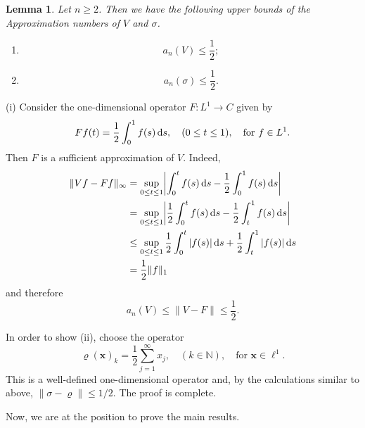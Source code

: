 \documentclass[10pt,reqno]{amsart}
\def\N{\mathbb{N}}
\def\d{{\fam0 d}}
\newtheorem{lemma}[theorem]{Lemma}
\numberwithin{equation}{section}
\let\oldendproof\endproof
\renewenvironment{proof}[1][\proofname]{%
  \oldproof[\bf #1]%
}{\oldendproof}
\def\Li{{L^1}}
\def\li{{\ell^1}}
\def\Linf{{C}}
\def\vx{\mathbf{x}}
\begin{document}
\begin{lemma} \label{lemm:approx}
Let $n\ge 2$.
Then we have the following upper bounds of the Approximation numbers of $V$ and $\sigma$.
\begin{enumerate}[\rm (i)]
\item 
\begin{equation*}
	a_n(V) \le \frac{1}{2};
\end{equation*}
\item 
\begin{equation*}
	a_n(\sigma) \le \frac{1}{2}.
\end{equation*}
\end{enumerate}
\end{lemma}

\begin{proof}
(i) Consider the one-dimensional operator $F\colon\Li\to\Linf$ given by
\begin{equation*}
	Ff(t) = \frac{1}{2}\int_0^1 f(s)\,\d s,
	\quad (0\le t \le1),
	\quad\text{for $f\in\Li$.}
\end{equation*}
Then $F$ is a sufficient approximation of $V$. Indeed,
\begin{align*}
	\|Vf - Ff\|_{\infty}
		& = \sup_{0\le t\le 1} \biggl| \int_0^t f(s)\,\d s - \frac{1}{2} \int_{0}^{1} f(s)\,\d s \biggr|
			\\
		& = \sup_{0\le t\le 1} \biggl| \frac{1}{2} \int_0^t f(s)\,\d s - \frac{1}{2} \int_{t}^{1} f(s)\,\d s \biggr|
			\\
		& \le \sup_{0\le t\le 1} \frac{1}{2} \int_{0}^{t} |f(s)|\,\d s
			+ \frac{1}{2} \int_{t}^{1} |f(s)|\,\d s
			\\
		& = \frac{1}{2} \|f\|_{1}
\end{align*}
and therefore
\begin{equation*}
	a_n(V)\le \|V-F\| \le \frac{1}{2}.
\end{equation*}

In order to show (ii), choose the operator
\begin{equation*}
	\varrho(\vx)_k = \frac{1}{2}\sum_{j=1}^\infty x_j,
		\quad (k\in\N),
		\quad \text{for $\vx\in\li$.}
\end{equation*}
This is a well-defined one-dimensional operator and, by the calculations similar to above,
$\|\sigma-\varrho\|\le 1/2$. The proof is complete.
\end{proof}

Now, we are at the position to prove the main results.
\end{document}
